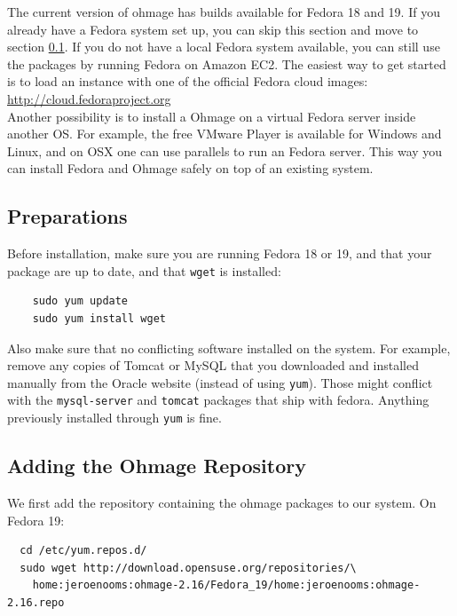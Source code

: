 \documentclass{scrartcl}
\begin{document}
The current version of ohmage has builds available for Fedora 18 and 19.
If you already have a Fedora system set up, you can skip this section and
move to section \ref{preparations}.
If you do not have a local Fedora system available, you can still use
the packages by running Fedora on Amazon EC2. The easiest way to get started is
to load an instance with one of the official Fedora cloud images: \\

\url{http://cloud.fedoraproject.org} \\

\noindent Another possibility is to install a Ohmage on a virtual Fedora server
inside another OS. For example, the free VMware Player is available for Windows 
and Linux, and on OSX one can use parallels to run an Fedora server. This way
you can install Fedora and Ohmage safely on top of an existing system.

\subsection{Preparations}
\label{preparations}

Before installation, make sure you are running Fedora 18 or 19, and that your
package are up to date, and that \texttt{wget} is installed:

\begin{verbatim}
    sudo yum update
    sudo yum install wget
\end{verbatim}

\noindent Also make sure that no conflicting software installed on the system.
For example, remove any copies of Tomcat or MySQL that you downloaded and
installed manually from the Oracle website (instead of using \texttt{yum}).
Those might conflict with the \texttt{mysql-server} and \texttt{tomcat}
packages that ship with fedora. Anything previously installed through
\texttt{yum} is fine.

\subsection{Adding the Ohmage Repository}

We first add the repository containing the ohmage packages to our system. On
Fedora 19:

\begin{verbatim}
  cd /etc/yum.repos.d/
  sudo wget http://download.opensuse.org/repositories/\
    home:jeroenooms:ohmage-2.16/Fedora_19/home:jeroenooms:ohmage-2.16.repo
\end{verbatim}
\end{document}

